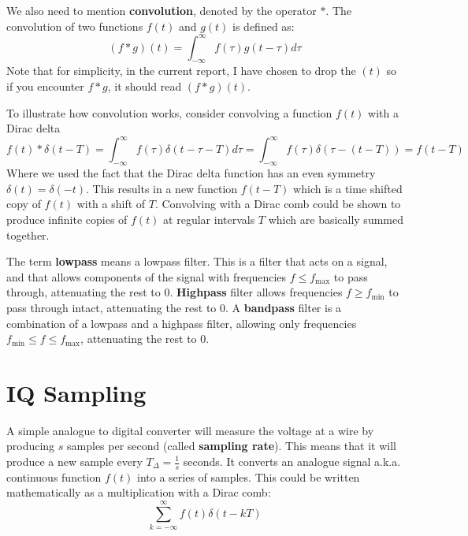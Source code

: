 \documentclass[a4paper,12pt,twoside,openright]{report}
\begin{document}
We also need to mention \textbf{convolution}, denoted by the operator $\ast$. The convolution of two functions $f(t)$ and $g(t)$ is defined as:
$$(f \ast g)(t) = \int_{-\infty}^{\infty} f(\tau) g(t - \tau) d \tau$$
Note that for simplicity, in the current report, I have chosen to drop the $(t)$ so if you encounter $f \ast g$, it should read $(f \ast g)(t)$.

To illustrate how convolution works, consider convolving a function $f(t)$ with a Dirac delta
$$ f(t) \ast \delta(t-T) =  \int_{-\infty}^{\infty} f(\tau) \delta(t - \tau - T ) d \tau = \int_{-\infty}^{\infty} f(\tau) \delta( \tau - ( t -T) ) = f(t-T)$$
Where we used the fact that the Dirac delta function has an even symmetry $\delta(t) = \delta(-t)$. This results in a new function $f(t-T)$ which is a time shifted copy of $f(t)$ with a shift of $T$. Convolving with a Dirac comb could be shown to produce infinite copies of $f(t)$ at regular intervals $T$ which are basically summed together.

The term \textbf{lowpass} means a lowpass filter. This is a filter that acts on a signal, and that allows components of the signal with frequencies $f \leq f_\text{max}$ to pass through, attenuating the rest to 0. \textbf{Highpass} filter allows frequencies $f \geq f_\text{min}$ to pass through intact, attenuating the rest to 0. A \textbf{bandpass} filter is a combination of a lowpass and a highpass filter, allowing only frequencies $f_\text{min} \leq f \leq f_\text{max}$, attenuating the rest to 0.

\section{IQ Sampling} 
\label{sec:IQSampling}

A simple analogue to digital converter will measure the voltage at a wire by producing $s$ samples per second (called \textbf{sampling rate}). This means that it will produce a new sample every $T_{\Delta} = \frac{1}{s}$ seconds. It converts an analogue signal a.k.a. continuous function $f(t)$ into a series of samples. This could be written mathematically as a multiplication with a Dirac comb:
\begin{equation}
\label{eq:sampling}
\sum_{k=-\infty}^{\infty} f(t) \delta(t - kT)
\end{equation}
\end{document}
